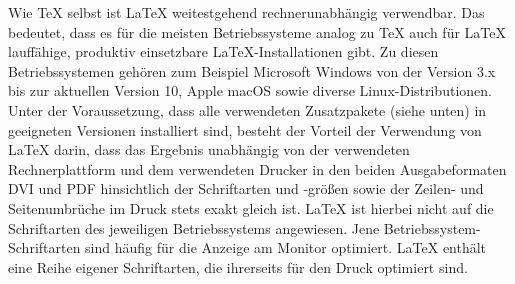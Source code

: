 \documentclass[ 12pt, a4paper, parskip=full]{scrartcl}
\begin{document}
Wie TeX selbst ist LaTeX weitestgehend rechnerunabhängig verwendbar. Das bedeutet, dass es für die meisten Betriebssysteme analog zu TeX auch für LaTeX lauffähige, produktiv einsetzbare LaTeX-Installationen gibt. Zu diesen Betriebssystemen gehören zum Beispiel Microsoft Windows von der Version 3.x bis zur aktuellen Version 10, Apple macOS sowie diverse Linux-Distributionen. Unter der Voraussetzung, dass alle verwendeten Zusatzpakete (siehe unten) in geeigneten Versionen installiert sind, besteht der Vorteil der Verwendung von LaTeX darin, dass das Ergebnis unabhängig von der verwendeten Rechnerplattform und dem verwendeten Drucker in den beiden Ausgabeformaten DVI und PDF hinsichtlich der Schriftarten und -größen sowie der Zeilen- und Seitenumbrüche im Druck stets exakt gleich ist. LaTeX ist hierbei nicht auf die Schriftarten des jeweiligen Betriebssystems angewiesen. Jene Betriebssystem-Schriftarten sind häufig für die Anzeige am Monitor optimiert. LaTeX enthält eine Reihe eigener Schriftarten, die ihrerseits für den Druck optimiert sind. 
\end{document}
